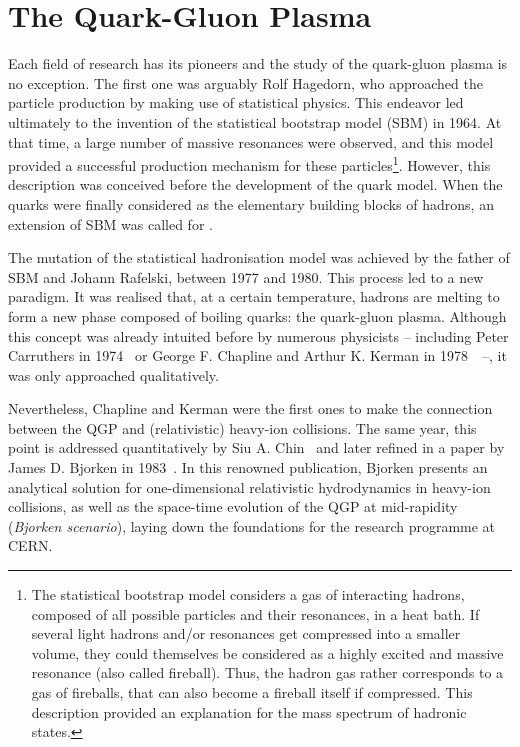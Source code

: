 \section{The Quark-Gluon Plasma}
\label{sec:QGP}

Each field of research has its pioneers and the study of the quark-gluon plasma is no exception. The first one was arguably Rolf Hagedorn, who approached the particle production by making use of statistical physics. This endeavor led ultimately to the invention of the statistical bootstrap model (SBM) in 1964. At that time, a large number of massive resonances were observed, and this model provided a successful production mechanism for these particles\footnote{The statistical bootstrap model considers a gas of interacting hadrons, composed of all possible particles and their resonances, in a heat bath. If several light hadrons and/or resonances get compressed into a smaller volume, they could themselves be considered as a highly excited and massive resonance (also called fireball). Thus, the hadron gas rather corresponds to a gas of fireballs, that can also become a fireball itself if compressed. This description provided an explanation for the mass spectrum of hadronic states.}. However, this description was conceived before the development of the quark model. When the quarks were finally considered as the elementary building blocks of hadrons, an extension of SBM was called for \cite{rafelskiMeltingHadronsBoiling2015a}.

The mutation of the statistical hadronisation model was achieved by the father of SBM and Johann Rafelski, between 1977 and 1980. This process led to a new paradigm. It was realised that, at a certain temperature, hadrons are melting to form a new phase composed of boiling quarks: the quark-gluon plasma. Although this concept was already intuited before by numerous physicists -- including Peter Carruthers in 1974~\cite{rafelskiMeltingHadronsBoiling2015} or George F. Chapline and Arthur K. Kerman in 1978~\cite{chaplinePossibilityMakingQuark1978}~--, it was only approached qualitatively.

Nevertheless, Chapline and Kerman were the first ones to make the connection between the QGP and (relativistic) heavy-ion collisions. The same year, this point is addressed quantitatively by Siu A. Chin~\cite{chinTransitionHotQuark1978a} and later refined in a paper by James D. Bjorken in 1983~\cite{bjorkenHighlyRelativisticNucleusnucleus1983}. In this renowned publication, Bjorken presents an analytical solution for one-dimensional relativistic hydrodynamics in heavy-ion collisions, as well as the space-time evolution of the QGP at mid-rapidity (\textit{Bjorken scenario}), laying down the foundations for the research programme at CERN.\\

